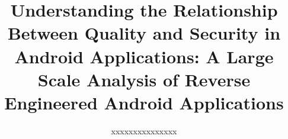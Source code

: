 \documentclass{sig-alternate-05-2015}
\newif\ifisnopii
\begin{document}


\title{Understanding the Relationship Between Quality and Security in Android Applications: A Large Scale Analysis of Reverse Engineered Android Applications}



%
\ifisnopii %
\author{
%
\alignauthor
Daniel~E.~Krutz~\&~Samuel~A.~Malachowsky\\ 	
	\affaddr{Software Engineering Department}\\
       \affaddr{Rochester Institute of Technology}\\
       \affaddr{1 Lomb Memorial Drive}\\
       \affaddr{Rochester, NY, USA} \\
       \email{\{dxkvse, samvse\}@rit.edu}
       \alignauthor
} %

\else %
\author{
%
\alignauthor
xxxxxxxxxxxxxxx\\ 	
	\\
       \\
        \\
       \alignauthor
} %
\fi %
\end{document}
